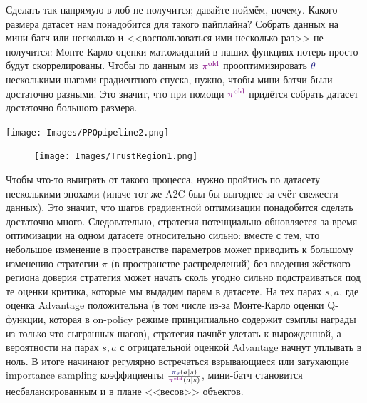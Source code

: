 Сделать так напрямую в лоб не получится; давайте поймём, почему. Какого размера датасет нам понадобится для такого пайплайна? Собрать данных на мини-батч или несколько и <<воспользоваться ими несколько раз>> не получится: Монте-Карло оценки мат.ожиданий в наших функциях потерь просто будут скоррелированы. Чтобы по данным из $\textcolor{ChadPurple}{\pi^{\old}}$ прооптимизировать $\textcolor{ChadBlue}{\theta}$ несколькими шагами градиентного спуска, нужно, чтобы мини-батчи были достаточно разными. Это значит, что при помощи $\textcolor{ChadPurple}{\pi^{\old}}$ придётся собрать датасет достаточно большого размера.

\vspace{0.4cm}
\begin{center}
\texttt{[image: Images/PPOpipeline2.png]}
\end{center}

\begin{figure}
\vspace{-0.5cm}
\centering
\texttt{[image: Images/TrustRegion1.png]}
\vspace{-0.5cm}
\end{figure}

Чтобы что-то выиграть от такого процесса, нужно пройтись по датасету несколькими эпохами (иначе тот же A2C был бы выгоднее за счёт свежести данных). Это значит, что шагов градиентной оптимизации понадобится сделать достаточно много. Следовательно, стратегия потенциально обновляется за время оптимизации на одном датасете относительно сильно: вместе с тем, что небольшое изменение в пространстве параметров может приводить к большому изменению стратегии $\pi$ (в пространстве распределений) без введения жёсткого региона доверия стратегия может начать сколь угодно сильно подстраиваться под те оценки критика, которые мы выдадим парам в датасете. На тех парах $s, a$, где оценка Advantage положительна (в том числе из-за Монте-Карло оценки Q-функции, которая в on-policy режиме принципиально содержит сэмплы награды из только что сыгранных шагов), стратегия начнёт улетать к вырожденной, а вероятности на парах $s, a$ с отрицательной оценкой Advantage начнут уплывать в ноль. В итоге начинают регулярно встречаться взрывающиеся или затухающие importance sampling коэффициенты $\frac{\textcolor{ChadBlue}{\pi_\theta}(a \mid s)}{\textcolor{ChadPurple}{\pi^{\old}}(a \mid s)}$, мини-батч становится несбалансированным и в плане <<весов>> объектов.

